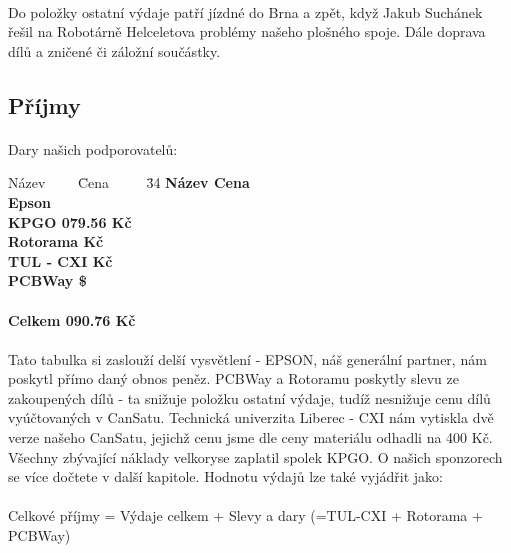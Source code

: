 \documentclass[a4paper]{report}
\begin{document}
\paragraph{} Do položky ostatní výdaje patří jízdné do Brna a zpět, když Jakub Suchánek řešil na Robotárně Helceletova problémy našeho plošného spoje. Dále doprava dílů a zničené či záložní součástky.
\subsection {Příjmy}
\paragraph{} Dary našich podporovatelů:
 \begin{tabbing}
    Název ~~~~\= Cena ~~~~
    \= 34 \kill
    \bfseries  Název\>\>
    \bfseries Cena\>\\
    Epson \>\>\textbf{}\\
    KPGO \> 079.56 Kč\\
    Rotorama \> Kč\\
    TUL - CXI \> Kč\\
    PCBWay \> \$\\\\
    Celkem \> 090.76 Kč\\
    \end{tabbing}
\paragraph{} Tato tabulka si zaslouží delší vysvětlení - EPSON, náš generální partner, nám poskytl přímo daný obnos peněz. PCBWay a Rotoramu poskytly slevu ze zakoupených dílů - ta snižuje položku ostatní výdaje, tudíž nesnižuje cenu dílů vyúčtovaných v CanSatu. Technická univerzita Liberec - CXI nám vytiskla dvě verze našeho CanSatu, jejichž cenu jsme dle ceny materiálu odhadli na 400 Kč. Všechny zbývající náklady velkoryse zaplatil spolek KPGO. O našich sponzorech se více dočtete v další kapitole. Hodnotu výdajů lze také vyjádřit jako:
\paragraph{} Celkové příjmy = Výdaje celkem + Slevy a dary (=TUL-CXI + Rotorama + PCBWay)
\end{document}
